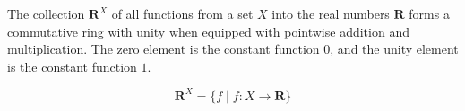 The collection $\mathbf{R}^X$ of all functions from a set $X$ into the real numbers $\mathbf{R}$ forms a commutative ring with unity when equipped with pointwise addition and multiplication. The zero element is the constant function $0$, and the unity element is the constant function $1$.

$$\mathbf{R}^X = \{f \mid f: X \to \mathbf{R}\}$$
